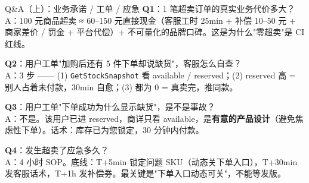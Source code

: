 \documentclass[aspectratio=169,11pt]{beamer}
\begin{document}
\appendix

\begin{frame}[shrink]{Q\&A（上）：业务承诺 / 工单 / 应急}
\textbf{Q1}：1 笔超卖订单的真实业务代价多大？\\
\hspace{4mm}\small A：100 元商品超卖 ≈ 60--150 元直接现金（客服工时 25min + 补偿 10--50 元 + 商家差价 / 罚金 + 平台代偿）+ 不可量化的品牌口碑。这是为什么"零超卖"是 CI 红线。

\vspace{1mm}
\textbf{Q2}：用户工单"加购后还有 5 件下单却说缺货"，客服怎么自查？\\
\hspace{4mm}\small A：3 步 —— (1) \texttt{GetStockSnapshot} 看 available / reserved；(2) reserved 高 = 别人占着未付款，30min 自愈；(3) 都为 0 = 真卖完，推同款。

\vspace{1mm}
\textbf{Q3}：用户工单"下单成功为什么显示缺货"，是不是事故？\\
\hspace{4mm}\small A：不是。该用户已进 reserved，商详只看 available，是\textbf{有意的产品设计}（避免焦虑性下单）。话术：库存已为您锁定，30 分钟内付款。

\vspace{1mm}
\textbf{Q4}：发生超卖了应急多久？\\
\hspace{4mm}\small A：4 小时 SOP。底线：T+5min 锁定问题 SKU（动态关下单入口），T+30min 发客服话术，T+1h 发补偿券。最关键是"下单入口动态可关"，不能等发版。
\end{frame}
\end{document}
